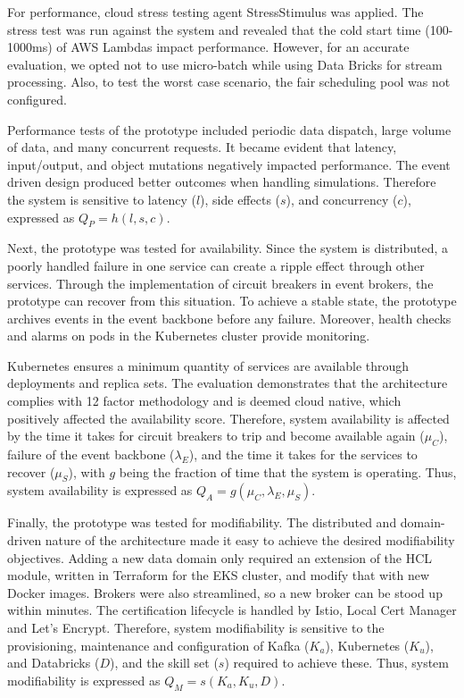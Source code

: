 \documentclass[a4paper,11pt]{article}
\begin{document}
For performance, cloud stress testing agent StressStimulus was applied. The stress test was run against the system and revealed that the cold start time (100-1000ms) of AWS Lambdas impact performance. However, for an accurate evaluation, we opted not to use micro-batch while using Data Bricks for stream processing. Also, to test the worst case scenario, the fair scheduling pool was not configured. 

Performance tests of the prototype included periodic data dispatch, large volume of data, and many concurrent requests. It became evident that latency, input/output, and object mutations negatively impacted performance. The event driven design produced better outcomes when handling simulations.  Therefore the system is sensitive to latency ($l$), side effects ($s$), and concurrency ($c$), expressed as $Q_P = h(l, s, c)$.

Next, the prototype was tested for availability. Since the system is distributed, a poorly handled failure in one service can create a ripple effect through other services. Through the implementation of circuit breakers in event brokers, the prototype can recover from this situation. To achieve a stable state, the prototype archives events in the event backbone before any failure. Moreover, health checks and alarms on pods in the Kubernetes cluster provide monitoring. 

Kubernetes ensures a minimum quantity of services are available through deployments and replica sets. The evaluation demonstrates that the architecture complies with 12 factor methodology and is deemed cloud native, which positively affected the availability score. Therefore, system availability is affected by the time it takes for circuit breakers to trip and become available again ($\mu_C$), failure of the event backbone ($\lambda_E$), and the time it takes for the services to recover ($\mu_S$), with $g$ being the fraction of time that the system is operating. Thus, system availability is expressed as $Q_A = g(\mu_C, \lambda_E, \mu_S)$.

Finally, the prototype was tested for modifiability. The distributed and domain-driven nature of the architecture made it easy to achieve the desired modifiability objectives. Adding a new data domain only required an extension of the HCL module, written in Terraform for the EKS cluster, and modify that with new Docker images. Brokers were also streamlined, so a new broker can be stood up within minutes. The certification lifecycle is handled by Istio, Local Cert Manager and Let's Encrypt. Therefore, system modifiability is sensitive to the provisioning, maintenance and configuration of Kafka ($K_a$), Kubernetes ($K_u$), and Databricks ($D$), and the skill set ($s$) required to achieve these. Thus, system modifiability is expressed as $Q_M = s(K_a, K_u, D)$. 
\end{document}
